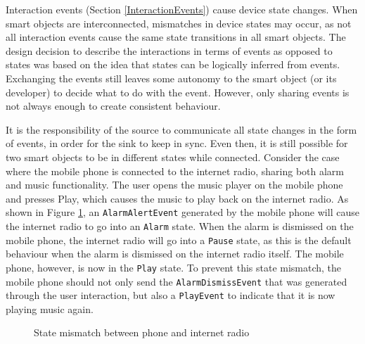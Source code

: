 Interaction events (Section \ref{InteractionEvents}) cause device state changes. When smart objects are interconnected, mismatches in device states may occur, as not all interaction events cause the same state transitions in all smart objects. The design decision to describe the interactions in terms of events as opposed to states was based on the idea that states can be logically inferred from events. Exchanging the events still leaves some autonomy to the smart object (or its developer) to decide what to do with the event. However, only sharing events is not always enough to create consistent behaviour. 

It is the responsibility of the source to communicate all state changes in the form of events, in order for the sink to keep in sync. Even then, it is still possible for two smart objects to be in different states while connected. Consider the case where the mobile phone is connected to the internet radio, sharing both alarm and music functionality. The user opens the music player on the mobile phone and presses Play, which causes the music to play back on the internet radio. As shown in Figure \ref{fsmPlayAlarm}, an \texttt{AlarmAlertEvent} generated by the mobile phone will cause the internet radio to go into an \texttt{Alarm} state. When the alarm is dismissed on the mobile phone, the internet radio will go into a \texttt{Pause} state, as this is the default behaviour when the alarm is dismissed on the internet radio itself. The mobile phone, however, is now in the \texttt{Play} state. To prevent this state mismatch, the mobile phone should not only send the \texttt{AlarmDismissEvent} that was generated through the user interaction, but also a \texttt{PlayEvent} to indicate that it is now playing music again.


\begin{figure}[bth]
    \caption{State mismatch between phone and internet radio}
   \label{fsmPlayAlarm}
\end{figure}



